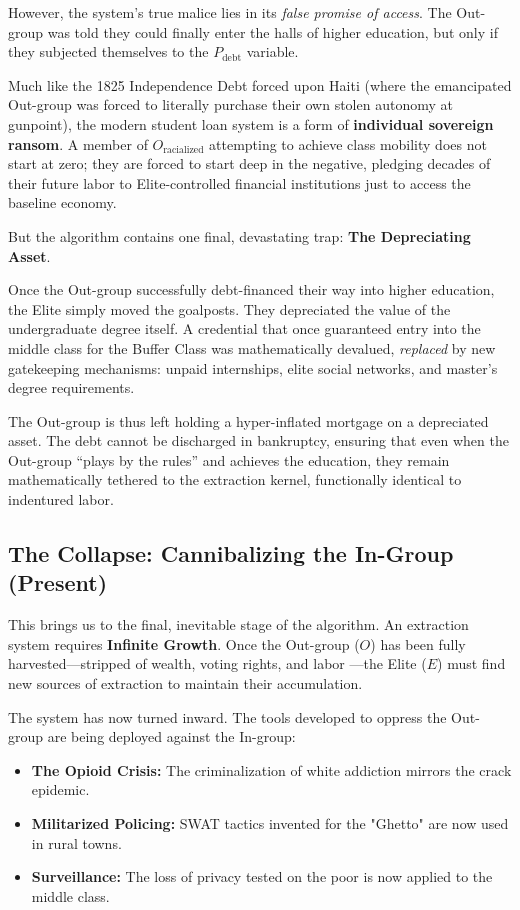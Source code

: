 \documentclass[12pt]{article}
\begin{document}
However, the system's true malice lies in its \textit{false promise of access}. The Out-group was told they could finally enter the halls of higher education, but only if they subjected themselves to the $P_{\text{debt}}$ variable.

Much like the 1825 Independence Debt forced upon Haiti (where the emancipated Out-group was forced to literally purchase their own stolen autonomy at gunpoint), the modern student loan system is a form of \textbf{individual sovereign ransom}. A member of $O_{\text{racialized}}$ attempting to achieve class mobility does not start at zero; they are forced to start deep in the negative, pledging decades of their future labor to Elite-controlled financial institutions just to access the baseline economy.

But the algorithm contains one final, devastating trap: \textbf{The Depreciating Asset}.

Once the Out-group successfully debt-financed their way into higher education, the Elite simply moved the goalposts. They depreciated the value of the undergraduate degree itself. A credential that once guaranteed entry into the middle class for the Buffer Class was mathematically devalued, \textit{replaced} by new gatekeeping mechanisms: unpaid internships, elite social networks, and master's degree requirements.

The Out-group is thus left holding a hyper-inflated mortgage on a depreciated asset. The debt cannot be discharged in bankruptcy, ensuring that even when the Out-group ``plays by the rules'' and achieves the education, they remain mathematically tethered to the extraction kernel, functionally identical to indentured labor.

\subsection{The Collapse: Cannibalizing the In-Group (Present)}
This brings us to the final, inevitable stage of the algorithm. An extraction system requires \textbf{Infinite Growth}. Once the Out-group ($O$) has been fully harvested---stripped of wealth, voting rights, and labor \cite{coates}---the Elite ($E$) must find new sources of extraction to maintain their accumulation.

The system has now turned inward. The tools developed to oppress the Out-group are being deployed against the In-group:
\begin{itemize}
    \item \textbf{The Opioid Crisis:} The criminalization of white addiction mirrors the crack epidemic.
    \item \textbf{Militarized Policing:} SWAT tactics invented for the "Ghetto" are now used in rural towns.
    \item \textbf{Surveillance:} The loss of privacy tested on the poor is now applied to the middle class.
\end{itemize}
\end{document}
